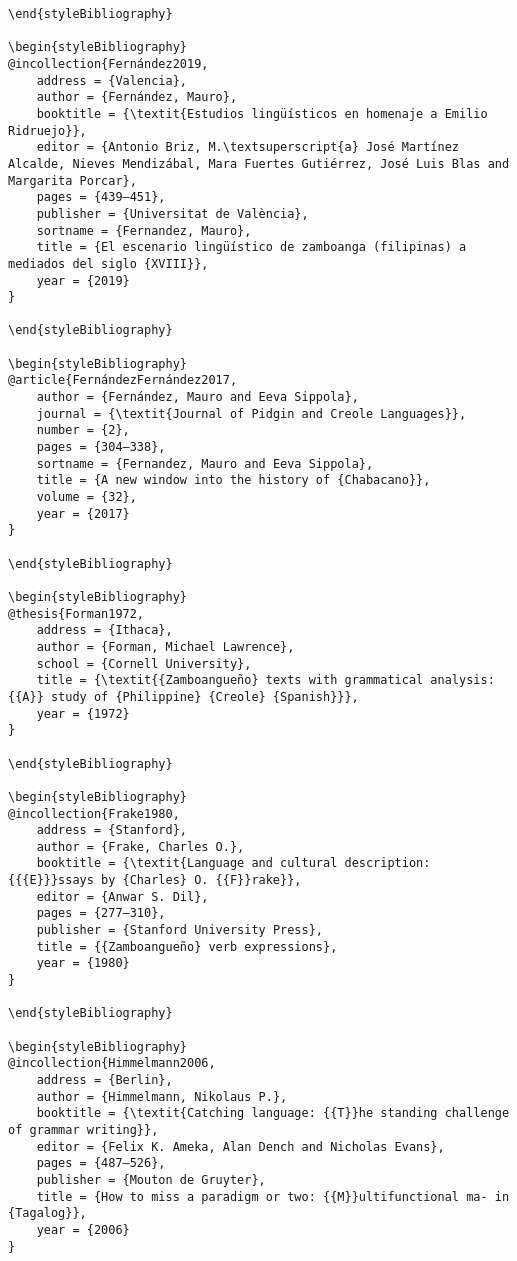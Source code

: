 \begin{stylelsUnNumberedSection}
\begin{verbatim}
\end{styleBibliography}

\begin{styleBibliography}
@incollection{Fernández2019,
	address = {Valencia},
	author = {Fernández, Mauro},
	booktitle = {\textit{Estudios lingüísticos en homenaje a Emilio Ridruejo}},
	editor = {Antonio Briz, M.\textsuperscript{a} José Martínez Alcalde, Nieves Mendizábal, Mara Fuertes Gutiérrez, José Luis Blas and Margarita Porcar},
	pages = {439–451},
	publisher = {Universitat de València},
	sortname = {Fernandez, Mauro},
	title = {El escenario lingüístico de zamboanga (filipinas) a mediados del siglo {XVIII}},
	year = {2019}
}

\end{styleBibliography}

\begin{styleBibliography}
@article{FernándezFernández2017,
	author = {Fernández, Mauro and Eeva Sippola},
	journal = {\textit{Journal of Pidgin and Creole Languages}},
	number = {2},
	pages = {304–338},
	sortname = {Fernandez, Mauro and Eeva Sippola},
	title = {A new window into the history of {Chabacano}},
	volume = {32},
	year = {2017}
}

\end{styleBibliography}

\begin{styleBibliography}
@thesis{Forman1972,
	address = {Ithaca},
	author = {Forman, Michael Lawrence},
	school = {Cornell University},
	title = {\textit{{Zamboangueño} texts with grammatical analysis: {{A}} study of {Philippine} {Creole} {Spanish}}},
	year = {1972}
}

\end{styleBibliography}

\begin{styleBibliography}
@incollection{Frake1980,
	address = {Stanford},
	author = {Frake, Charles O.},
	booktitle = {\textit{Language and cultural description: {{{E}}}ssays by {Charles} O. {{F}}rake}},
	editor = {Anwar S. Dil},
	pages = {277–310},
	publisher = {Stanford University Press},
	title = {{Zamboangueño} verb expressions},
	year = {1980}
}

\end{styleBibliography}

\begin{styleBibliography}
@incollection{Himmelmann2006,
	address = {Berlin},
	author = {Himmelmann, Nikolaus P.},
	booktitle = {\textit{Catching language: {{T}}he standing challenge of grammar writing}},
	editor = {Felix K. Ameka, Alan Dench and Nicholas Evans},
	pages = {487–526},
	publisher = {Mouton de Gruyter},
	title = {How to miss a paradigm or two: {{M}}ultifunctional ma- in {Tagalog}},
	year = {2006}
}


\end{verbatim}
\end{stylelsUnNumberedSection}
